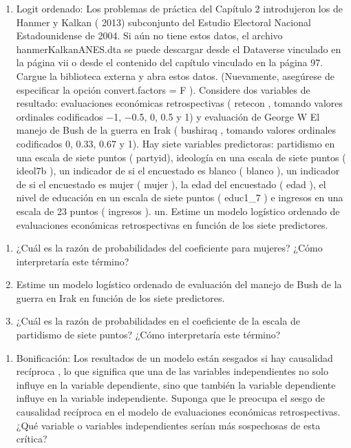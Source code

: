 \documentclass[
]{book}
\providecommand{\tightlist}{%
  \setlength{\itemsep}{0pt}\setlength{\parskip}{0pt}}
\begin{document}
\begin{enumerate}
\def\labelenumi{\arabic{enumi}.}
\setcounter{enumi}{1}
\tightlist
\item
  Logit ordenado: Los problemas de práctica del Capítulo 2 introdujeron los de Hanmer y Kalkan ( 2013) subconjunto del Estudio Electoral Nacional Estadounidense de 2004. Si aún no tiene estos datos, el archivo hanmerKalkanANES.dta se puede descargar desde el Dataverse vinculado en la página vii o desde el contenido del capítulo vinculado en la página 97. Cargue la biblioteca externa y abra estos datos. (Nuevamente, asegúrese de especificar la opción convert.factors = F ). Considere dos variables de resultado: evaluaciones económicas retrospectivas ( retecon , tomando valores ordinales codificados −1, −0.5, 0, 0.5 y 1) y evaluación de George W El manejo de Bush de la guerra en Irak ( bushiraq , tomando valores ordinales codificados 0, 0.33, 0.67 y 1). Hay siete variables predictoras: partidismo en una escala de siete puntos ( partyid), ideología en una escala de siete puntos ( ideol7b ), un indicador de si el encuestado es blanco ( blanco ), un indicador de si el encuestado es mujer ( mujer ), la edad del encuestado ( edad ), el nivel de educación en un escala de siete puntos ( educ1\_7 ) e ingresos en una escala de 23 puntos ( ingresos ).
  un.
  Estime un modelo logístico ordenado de evaluaciones económicas retrospectivas en función de los siete predictores.
\end{enumerate}

\begin{enumerate}
\def\labelenumi{\Alph{enumi}.}
\setcounter{enumi}{1}
\item
  ¿Cuál es la razón de probabilidades del coeficiente para mujeres? ¿Cómo interpretaría este término?
\item
  Estime un modelo logístico ordenado de evaluación del manejo de Bush de la guerra en Irak en función de los siete predictores.
\item
  ¿Cuál es la razón de probabilidades en el coeficiente de la escala de partidismo de siete puntos? ¿Cómo interpretaría este término?
\end{enumerate}

\begin{enumerate}
\def\labelenumi{\roman{enumi}.}
\setcounter{enumi}{1000}
\tightlist
\item
  Bonificación: Los resultados de un modelo están sesgados si hay causalidad recíproca , lo que significa que una de las variables independientes no solo influye en la variable dependiente, sino que también la variable dependiente influye en la variable independiente. Suponga que le preocupa el sesgo de causalidad recíproca en el modelo de evaluaciones económicas retrospectivas. ¿Qué variable o variables independientes serían más sospechosas de esta crítica?
\end{enumerate}
\end{document}

